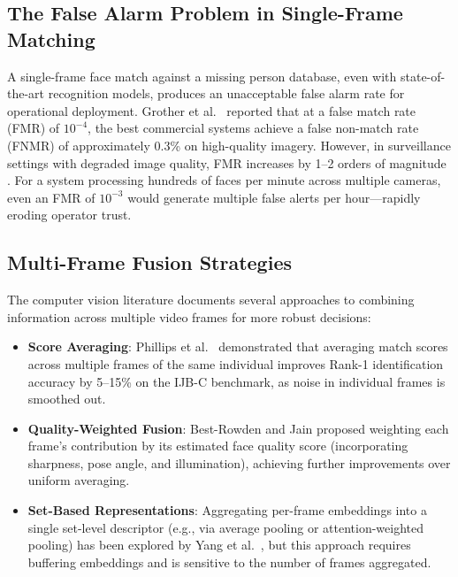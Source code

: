 \documentclass[12pt, a4paper]{article}
\begin{document}
\subsection{The False Alarm Problem in Single-Frame Matching}

A single-frame face match against a missing person database, even with state-of-the-art recognition models, produces an unacceptable false alarm rate for operational deployment. Grother et al.\ \cite{grother2019} reported that at a false match rate (FMR) of $10^{-4}$, the best commercial systems achieve a false non-match rate (FNMR) of approximately 0.3\% on high-quality imagery. However, in surveillance settings with degraded image quality, FMR increases by 1--2 orders of magnitude \cite{nist_frvt2023}. For a system processing hundreds of faces per minute across multiple cameras, even an FMR of $10^{-3}$ would generate multiple false alerts per hour---rapidly eroding operator trust.

\subsection{Multi-Frame Fusion Strategies}

The computer vision literature documents several approaches to combining information across multiple video frames for more robust decisions:

\begin{itemize}[leftmargin=*]
    \item \textbf{Score Averaging}: Phillips et al.\ \cite{phillips2018} demonstrated that averaging match scores across multiple frames of the same individual improves Rank-1 identification accuracy by 5--15\% on the IJB-C benchmark, as noise in individual frames is smoothed out.
    
    \item \textbf{Quality-Weighted Fusion}: Best-Rowden and Jain \cite{bestrowden2018} proposed weighting each frame's contribution by its estimated face quality score (incorporating sharpness, pose angle, and illumination), achieving further improvements over uniform averaging.
    
    \item \textbf{Set-Based Representations}: Aggregating per-frame embeddings into a single set-level descriptor (e.g., via average pooling or attention-weighted pooling) has been explored by Yang et al.\ \cite{yang2020clustering}, but this approach requires buffering embeddings and is sensitive to the number of frames aggregated.
\end{itemize}
\end{document}
